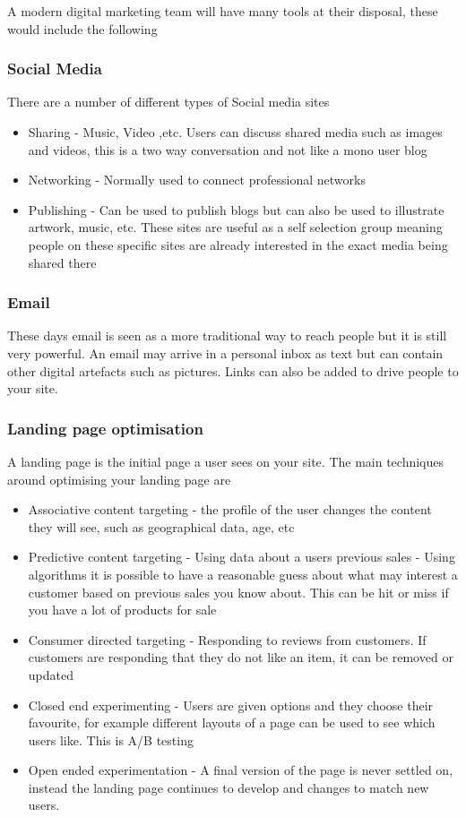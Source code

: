 \documentclass{article}
\begin{document}
A modern digital marketing team will have many tools at their disposal, these would include the following

\subsubsection{Social Media}
There are a number of different types of Social media sites
\begin{itemize}
\item Sharing - Music, Video ,etc. Users can discuss shared media such as images and videos, this is a two way conversation and not like a mono user blog
\item Networking - Normally used to connect professional networks
\item Publishing - Can be used to publish blogs but can also be used to illustrate artwork, music, etc. These sites are useful as a self selection group meaning people on these specific sites are already interested in the exact media being shared there
\end{itemize}


\subsubsection{Email}
These days email is seen as a more traditional way to reach people but it is still very powerful.
An email may arrive in a personal inbox as text but can contain other digital artefacts such as pictures. Links can also be added to drive people to your site.

\subsubsection{Landing page optimisation}
A landing page is the initial page a user sees on your site.
The main techniques around optimising your landing page are
\begin{itemize}
\item Associative content targeting - the profile of the user changes the content they will see, such as geographical data, age, etc
\item Predictive content targeting - Using data about a users previous sales - Using algorithms it is possible to have a reasonable guess about what may interest a customer based on previous sales you know about. This can be hit or miss if you have a lot of products for sale
\item Consumer directed targeting - Responding to reviews from customers. If customers are responding that they do not like an item, it can be removed or updated
\item Closed end experimenting - Users are given options and they choose their favourite, for example different layouts of a page can be used to see which users like. This is A/B testing
\item Open ended experimentation - A final version of the page is never settled on, instead the landing page continues to develop and changes to match new users.
\end{itemize}
\end{document}
